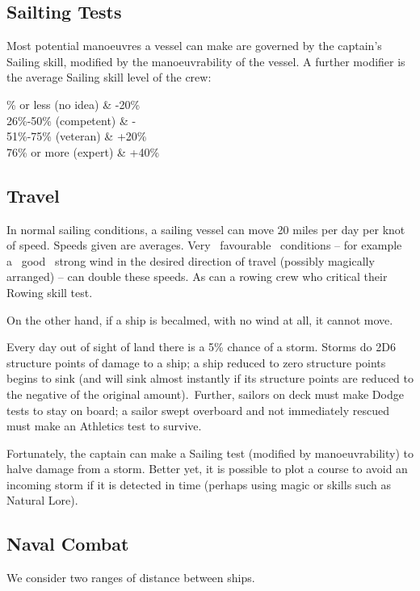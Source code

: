 \subsection{Sailting Tests}
Most potential manoeuvres a vessel can make are governed by the captain’s Sailing skill, modified by the manoeuvrability of the vessel. A further modifier is the average Sailing skill level of the crew:
\begin{table}[H]
\begin{center}
\begin{rpg-table}[|X|Y|]
        \% or less (no idea) & -20\%\\
	26\%-50\% (competent) & -\\
	51\%-75\% (veteran) & +20\%\\
	76\% or more (expert) & +40\%\\
	\hline
\end{rpg-table}
\end{center}
\end{table}


\subsection{Travel}
In normal sailing conditions, a sailing vessel can move 20 miles per day per knot of speed. Speeds given are averages. Very  favourable  conditions – for example a  good  strong wind in the desired direction of travel (possibly magically arranged) – can double these speeds. As can a rowing crew who critical their Rowing skill test. 

On the other hand, if a ship is becalmed, with no wind at all, it cannot move.

Every day out of sight of land there is a 5\% chance of a storm. Storms do 2D6 structure points of damage to a ship; a ship reduced to zero structure points begins to sink (and will sink almost instantly if its structure points are reduced to the negative of the original amount). Further, sailors on deck must make Dodge tests to stay on board; a sailor swept overboard and not immediately rescued must make an Athletics test to survive.

Fortunately, the captain can make a Sailing test (modified by manoeuvrability) to halve damage from a storm. Better yet, it is possible to plot a course to avoid an incoming storm if it is detected in time (perhaps using magic or skills such as Natural Lore).

\subsection{Naval Combat}
We consider two ranges of distance between ships.

